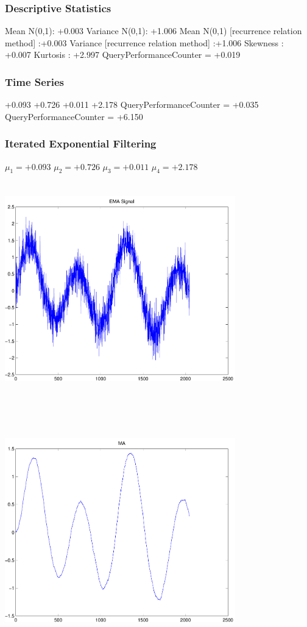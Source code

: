 \documentclass[9pt]{article}
\theoremstyle{plain}
\theoremstyle{definition}
\theoremstyle{remark}
\numberwithin{equation}{section}
\begin{document}
\subsubsection{Descriptive Statistics}
Mean N(0,1): +0.003
Variance N(0,1): +1.006
Mean N(0,1) [recurrence relation method] :+0.003
Variance [recurrence relation method] :+1.006
Skewness : +0.007
Kurtosis : +2.997
QueryPerformanceCounter  =  +0.019
\subsubsection{Time Series }
+0.093
+0.726
+0.011
+2.178
QueryPerformanceCounter  =  +0.035
QueryPerformanceCounter  =  +6.150
\subsubsection{Iterated Exponential Filtering }
$\mu_1 =+0.093$
$\mu_2 =+0.726$
$\mu_3 =+0.011$
$\mu_4 =+2.178$
\includegraphics[width=10.0cm,height=10.0cm]{EMA_signal.pdf}

\includegraphics[width=10.0cm,height=10.0cm]{MA.pdf}
\end{document}
